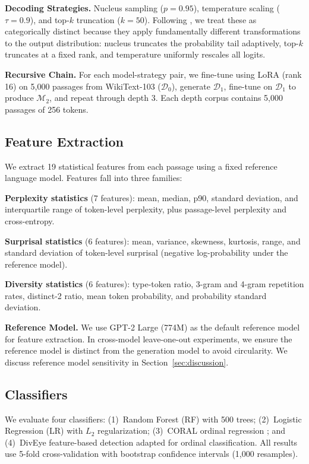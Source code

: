 \documentclass[11pt,a4paper]{article}
\begin{document}
\textbf{Decoding Strategies.} Nucleus sampling ($p{=}0.95$), temperature scaling ($\tau{=}0.9$), and top-$k$ truncation ($k{=}50$). Following \citet{garces2025decoding}, we treat these as categorically distinct because they apply fundamentally different transformations to the output distribution: nucleus truncates the probability tail adaptively, top-$k$ truncates at a fixed rank, and temperature uniformly rescales all logits.

\textbf{Recursive Chain.} For each model-strategy pair, we fine-tune using LoRA (rank 16) on 5,000 passages from WikiText-103 ($\mathcal{D}_0$), generate $\mathcal{D}_1$, fine-tune on $\mathcal{D}_1$ to produce $\mathcal{M}_2$, and repeat through depth 3. Each depth corpus contains 5,000 passages of 256 tokens.

\subsection{Feature Extraction}

We extract 19 statistical features from each passage using a fixed reference language model. Features fall into three families:

\textbf{Perplexity statistics} (7 features): mean, median, p90, standard deviation, and interquartile range of token-level perplexity, plus passage-level perplexity and cross-entropy.

\textbf{Surprisal statistics} (6 features): mean, variance, skewness, kurtosis, range, and standard deviation of token-level surprisal (negative log-probability under the reference model).

\textbf{Diversity statistics} (6 features): type-token ratio, 3-gram and 4-gram repetition rates, distinct-2 ratio, mean token probability, and probability standard deviation.

\textbf{Reference Model.} We use GPT-2 Large (774M) as the default reference model for feature extraction. In cross-model leave-one-out experiments, we ensure the reference model is distinct from the generation model to avoid circularity. We discuss reference model sensitivity in Section~\ref{sec:discussion}.

\subsection{Classifiers}

We evaluate four classifiers: (1)~Random Forest (RF) with 500 trees; (2)~Logistic Regression (LR) with $L_2$ regularization; (3)~CORAL ordinal regression \citep{cao2020rank}; and (4)~DivEye feature-based detection \citep{he2024diveye} adapted for ordinal classification. All results use 5-fold cross-validation with bootstrap confidence intervals (1,000 resamples).
\end{document}
